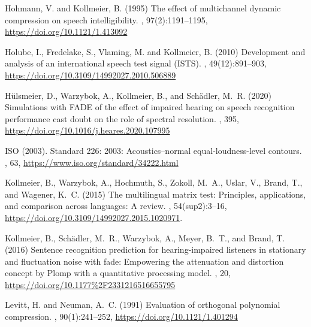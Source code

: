 \documentclass[10pt,a4paper,twocolumn]{article}
\begin{document}
\begin{thebibliography}{}
	Hohmann, V. and Kollmeier, B. (1995)
	\newblock The effect of multichannel dynamic compression on speech intelligibility.
	, 97(2):1191--1195, \url{https://doi.org/10.1121/1.413092}
	
	Holube, I., Fredelake, S., Vlaming, M. and Kollmeier, B. (2010)
	\newblock Development and analysis of an international speech test signal (ISTS).
	, 49(12):891--903, \url{https://doi.org/10.3109/14992027.2010.506889}
	
    Hülsmeier, D., Warzybok, A., Kollmeier, B., and Schädler, M.~R. (2020)
	\newblock Simulations with FADE of the effect of impaired hearing on speech recognition performance cast doubt on the role of spectral resolution.
	, 395, \url{https://doi.org/10.1016/j.heares.2020.107995}
	
	ISO (2003).
	\newblock Standard 226: 2003: Acoustics--normal equal-loudness-level contours.
	, 63, \url{https://www.iso.org/standard/34222.html}
	
	Kollmeier, B., Warzybok, A., Hochmuth, S., Zokoll, M.~A., Uslar, V., Brand, T., and Wagener, K.~C. (2015)
	\newblock The multilingual matrix test: Principles, applications, and comparison across languages: A review.
	, 54(sup2):3--16, \url{https://doi.org/10.3109/14992027.2015.1020971}.
	
	Kollmeier, B., Schädler, M.~R., Warzybok, A., Meyer, B.~T., and Brand, T. (2016)
	\newblock Sentence recognition prediction for hearing-impaired listeners in	stationary and fluctuation noise with fade: Empowering the attenuation and	distortion concept by Plomp with a quantitative processing model.
	, 20, \url{https://doi.org/10.1177%2F2331216516655795}

	Levitt, H. and Neuman, A.~C. (1991)
	\newblock Evaluation of orthogonal polynomial compression.
	, 90(1):241--252, \url{https://doi.org/10.1121/1.401294}


\end{thebibliography}
\end{document}
